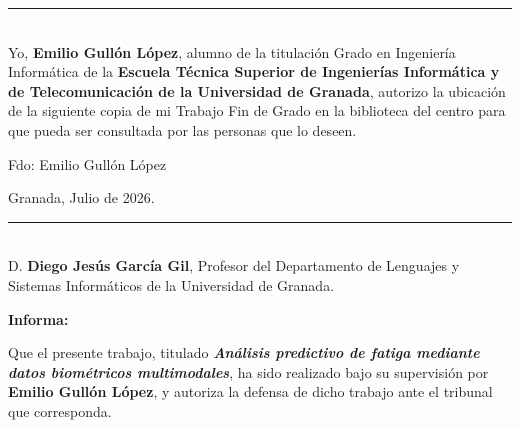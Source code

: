 \vspace*{\fill}
\clearpage

\thispagestyle{empty}

\noindent\rule[-1ex]{\textwidth}{2pt}\\[4.5ex]

Yo, \textbf{Emilio Gullón López}, alumno de la titulación Grado en Ingeniería Informática de la \textbf{Escuela Técnica Superior de Ingenierías Informática y de Telecomunicación de la Universidad de Granada}, autorizo la ubicación de la siguiente copia de mi Trabajo Fin de Grado en la biblioteca del centro para que pueda ser consultada por las personas que lo deseen.

\vspace{5cm}

\noindent Fdo: Emilio Gullón López

\vspace{2cm}

\begin{flushright}
Granada, Julio de 2026.
\end{flushright}

\clearpage

\thispagestyle{empty}

\noindent\rule[-1ex]{\textwidth}{2pt}\\[4.5ex]

D. \textbf{Diego Jesús García Gil}, Profesor del Departamento de Lenguajes y Sistemas Informáticos de la Universidad de Granada.

\vspace{1.0cm}

\textbf{Informa:}

\vspace{0.8cm}

Que el presente trabajo, titulado \textit{\textbf{Análisis predictivo de fatiga mediante datos biométricos multimodales}}, ha sido realizado bajo su supervisión por \textbf{Emilio Gullón López}, y autoriza la defensa de dicho trabajo ante el tribunal que corresponda.

\vspace{1.0cm}

